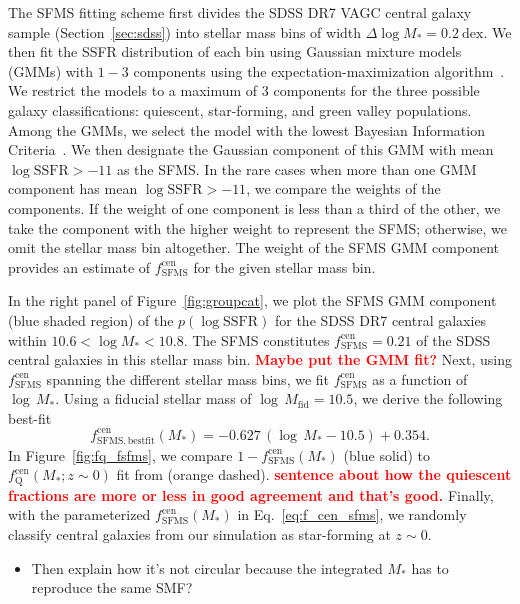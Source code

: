 \documentclass[12pt, letterpaper, preprint]{aastex}
\newcommand{\todo}[1]{{\bf \textcolor{red}{#1}}}
\newcommand{\beq}{\begin{equation}}
\newcommand{\eeq}{\end{equation}}
\newcommand{\bitem}{\begin{itemize}}
\newcommand{\eitem}{\end{itemize}}
\begin{document}
The SFMS fitting scheme first divides the SDSS DR7 VAGC central galaxy 
sample (Section~\ref{sec:sdss}) into stellar mass bins of 
width $\Delta \log M_* = 0.2~\mathrm{dex}$. We then fit the SSFR 
distribution of each bin using Gaussian mixture models (GMMs) with 
$1 - 3$ components using the expectation-maximization 
algorithm~\citep[EM;][]{dempster1977, neal1998}. We restrict the 
models to a maximum of $3$ components for the three possible
galaxy classifications: quiescent, star-forming, and green valley populations. 
Among the GMMs, we select the model with the lowest Bayesian Information 
Criteria~\citep[BIC][]{schwarz1978}. We then designate the Gaussian component 
of this GMM with mean $\log \mathrm{SSFR} > -11$ as the SFMS. In the 
rare cases when more than one GMM component has mean 
$\log \mathrm{SSFR} > -11$, we compare the weights of the components. 
If the weight of one component is less than a third of the other, 
we take the component with the higher weight to represent the SFMS; 
otherwise, we omit the stellar mass bin altogether. The weight of the 
SFMS GMM component provides an estimate of $f^\mathrm{cen}_\mathrm{SFMS}$ 
for the given stellar mass bin. 

In the right panel of Figure~\ref{fig:groupcat}, we plot the SFMS GMM component
(blue shaded region) of the $p(\log \mathrm{SSFR})$ for the SDSS DR7 central 
galaxies within $10.6 < \log M_* < 10.8$. The SFMS constitutes 
$f^\mathrm{cen}_\mathrm{SFMS} = 0.21$ of the SDSS central galaxies in 
this stellar mass bin. \todo{Maybe put the GMM fit?} 
Next, using $f^\mathrm{cen}_\mathrm{SFMS}$ spanning 
the different stellar mass bins, we fit $f^\mathrm{cen}_\mathrm{SFMS}$ as 
a function of $\log\,M_*$. Using a fiducial stellar mass of 
$\log\,M_\mathrm{fid} = 10.5$, we derive the following best-fit 
\beq \label{eq:f_cen_sfms}
f^\mathrm{cen}_\mathrm{SFMS, bestfit}(M_*) = -0.627\,(\log\,M_* - 10.5) + 0.354. 
\eeq
In Figure~\ref{fig:fq_fsfms}, we compare $1 - f^\mathrm{cen}_\mathrm{SFMS}(M_*)$ 
(blue solid) to $f_\mathrm{Q}^\mathrm{cen}(M_*; z\sim0)$ fit from \cite{hahn2017a} 
(orange dashed). \todo{sentence about how the quiescent fractions are more or less in
good agreement and that's good.} 
Finally, with the parameterized $f^\mathrm{cen}_\mathrm{SFMS}(M_*)$ in 
Eq.~\ref{eq:f_cen_sfms}, we randomly classify central galaxies from our simulation 
as star-forming at $z \sim 0$.

\bitem
\item Then explain how it's not circular because the integrated $M_*$ has to reproduce the same SMF?
\eitem
\end{document}
